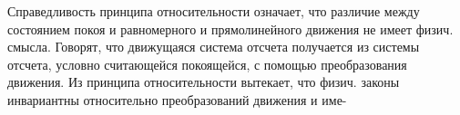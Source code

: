 \documentclass[10pt]{article}
\begin{document}
Справедливость принципа относительности означает, что различие между состоянием покоя и равномерного и прямолинейного движения не имеет физич. смысла. Говорят, что движущаяся система отсчета получается из системы отсчета, условно считающейся покоящейся, с помощью преобразования движения. Из принципа относительности вытекает, что физич. законы инвариантны относительно преобразований движения и име-
\end{document}
